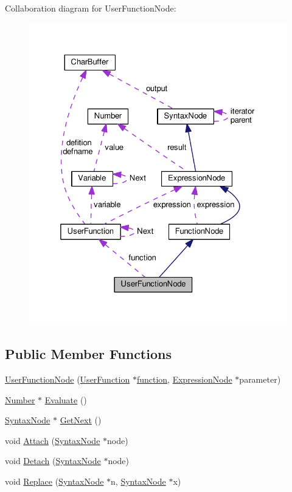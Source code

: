 Collaboration diagram for User\+Function\+Node\+:
\nopagebreak
\begin{figure}[H]
\begin{center}
\leavevmode
\includegraphics[width=325pt]{d2/d5b/classUserFunctionNode__coll__graph}
\end{center}
\end{figure}
\subsection*{Public Member Functions}
\begin{DoxyCompactItemize}
\item 
\hyperlink{classUserFunctionNode_af7a261eca3785022389cd02d36fa33d5}{User\+Function\+Node} (\hyperlink{classUserFunction}{User\+Function} $\ast$\hyperlink{classUserFunctionNode_aea2ba2bacd83f3cceb891b0b3e45580c}{function}, \hyperlink{classExpressionNode}{Expression\+Node} $\ast$parameter)
\item 
\hyperlink{structNumber}{Number} $\ast$ \hyperlink{classUserFunctionNode_a2efcbf95707c44463017973693c891db}{Evaluate} ()
\item 
\hyperlink{classSyntaxNode}{Syntax\+Node} $\ast$ \hyperlink{classUserFunctionNode_acc4c2efb6727a6aa8d216556434c8a27}{Get\+Next} ()
\item 
void \hyperlink{classUserFunctionNode_ab05c0002a4c62551813238bbdd5632a2}{Attach} (\hyperlink{classSyntaxNode}{Syntax\+Node} $\ast$node)
\item 
void \hyperlink{classUserFunctionNode_aec00fdd81b01b4257f1631771e50cf28}{Detach} (\hyperlink{classSyntaxNode}{Syntax\+Node} $\ast$node)
\item 
void \hyperlink{classUserFunctionNode_ad12ad72165eb03f17d7fbb1c2a80038b}{Replace} (\hyperlink{classSyntaxNode}{Syntax\+Node} $\ast$n, \hyperlink{classSyntaxNode}{Syntax\+Node} $\ast$x)
\end{DoxyCompactItemize}
